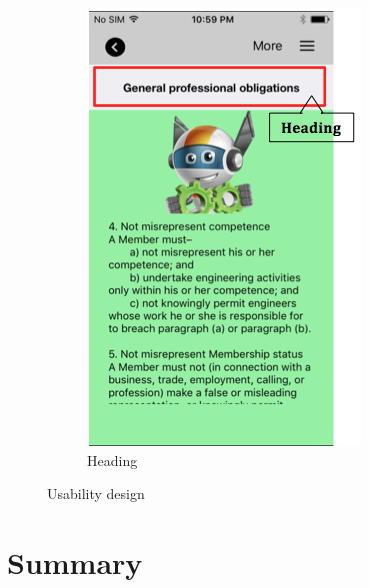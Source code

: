 \begin{figure}[!hbt]
\begin{subfigure}{0.335\textwidth}
\includegraphics[width=\textwidth]{heading}
\caption{Heading}
 \end{subfigure}\hspace{0.06\textwidth}
  \caption{Usability design}
\end{figure}

\section{Summary} 
















